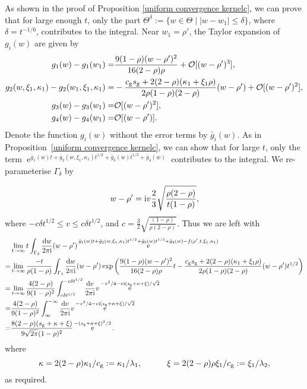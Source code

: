 \documentclass[cmp]{svjour}
\numberwithin{theorem}{section}
\numberwithin{equation}{section}
\DeclareMathOperator{\e}{e}
\def\dd{{\rm d}}
\def\ii{{\rm i}}
\begin{document}
As shown in the proof of Proposition \ref{uniform convergence kernelc}, we can prove that for large enough $t$, only the part $\Theta^{\delta}:=\{w\in \Theta \mid |w-w_1|\leq\delta \}$, where $\delta=t^{-1/6}$, contributes to the integral. Near $w_1=\rho'$, the Taylor expansion of $g_i(w)$ are given by
\begin{subequations}
\label{g taylor expand2}
\begin{align}
g_1(w)-g_1(w_1)
=&
\frac{9(1-\rho)(w-\rho')^2}{16(2-\rho)\rho}+
\mathcal{O}[(w-\rho')^3],
\\
g_2(w,\xi_1,\kappa_1)-g_2(w_1,\xi_1,\kappa_1)
=&
-\frac{c_{\rm g} s_{\rm g} + 2(2-\rho)(\kappa_1+\xi_1\rho)}{2\rho(1-\rho)(2-\rho)}(w-\rho')+
\mathcal{O}[(w-\rho')^2],
\\
g_3(w)-g_3(w_1)
=&
\mathcal{O}[(w-\rho')^2],
\\
g_4(w)-g_4(w_1)=&\mathcal{O}[(w-\rho')].
\end{align}
\end{subequations}
Denote the function $g_i (w)$ without the error terms by $\bar{g}_i(w)$. As in Proposition~\ref{uniform convergence kernelc}, we can show that for large $t$, only the term $\e^{\bar{g}_1(w)t+\bar{g}_2(w,\xi_1,\kappa_1)t^{1/2}+\bar{g}_3(w)t^{1/3}+\bar{g}_4(w)}$ contributes to the integral. We re-parameterise $\Gamma_{\delta}$ by


\begin{equation*}
  w-\rho'=\ii v\frac{2 }{3}\sqrt{\frac{\rho(2-\rho)}{t(1-\rho)}},
\end{equation*}
where $-c \delta t^{1/2} \leq v \leq c \delta t^{1/2}$, and $c=\tfrac{3}{2}\sqrt{\tfrac{(1-\rho)}{\rho(2-\rho)}}$. Thus we are left with
\begin{align*}
&\lim_{t\rightarrow\infty}t\int_{\Gamma_{\delta}}\frac{\dd w}{2\pi\ii} (w-\rho') \e^{\bar{g}_1(w)t+\bar{g}_2(w,\xi_1, \kappa_1)t^{1/2}+\bar{g}_3(w)t^{1/3}+\bar{g}_4(w)-f(\rho',t,\xi_1,\kappa_1)}
\\
=&\lim_{t\rightarrow\infty}
\frac{-t}{\rho(1-\rho)}\int_{\Gamma_{\delta}}\frac{\dd w}{2\pi\ii} (w-\rho') \exp\left(
\frac{9(1-\rho)(w-\rho')^2}{16(2-\rho)\rho}t-\frac{c_{\rm g} s_{\rm g} + 2(2-\rho)(\kappa_1+\xi_1\rho)}{2 \rho(1-\rho)(2-\rho)}(w-\rho')t^{1/2}
\right)\\
=&\lim_{t\rightarrow\infty}
\frac{4(2-\rho)}{9(1-\rho)^2}\int_{c\delta t^{1/2}}^{-c\delta t^{1/2}}\frac{\dd v}{2\pi\ii}
v\e^{-v^2/4-v\ii (s_{\rm g}+\kappa+\xi)/\sqrt{2}}\\
=&\frac{4(2-\rho)}{9(1-\rho)^2}\int_{\infty}^{-\infty}\frac{\dd v}{2\pi\ii}
v\e^{-v^2/4-v\ii (s_{\rm g}+\kappa+\xi)/\sqrt{2}}
\\
=&
\frac{8(2-\rho)(s_{\rm g}+\kappa+\xi)}{9\sqrt{2\pi}(1-\rho)^2}
\e^{-(s_{\rm g}+\kappa+\xi)^2/2}.
\end{align*}
where
\begin{equation*}
  \kappa= 2(2-\rho)\kappa_1/c_{\rm g}:=\kappa_1/\lambda_1,
  \quad\quad\quad
  \xi=2(2-\rho)\rho \xi_1/c_{\rm g}:=\xi_1/\lambda_2,
\end{equation*}
as required.




\end{document}
